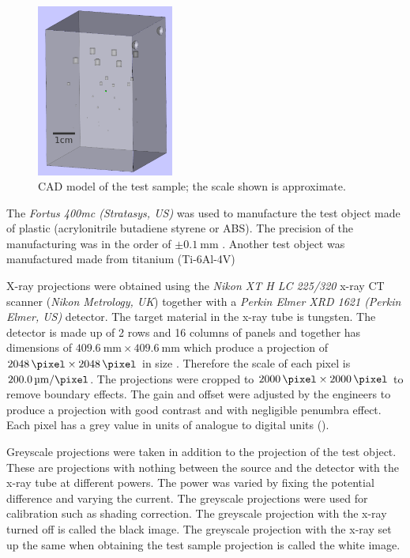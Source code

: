 \begin{figure}
  \centering
  \includegraphics[width=0.4\textwidth]{../figures/inference/TestObject.png}
  \caption{CAD model of the test sample; the scale shown is approximate.}
  \label{fig:inference_testObject}
\end{figure}

The \emph{Fortus 400mc (Stratasys, US)} was used to manufacture the test object made of plastic (acrylonitrile butadiene styrene or ABS). The precision of the manufacturing was in the order of $\pm\SI{0.1}{\milli\metre}$ \citep{hanseen2013fortus}. Another test object was manufactured made from titanium (Ti-6Al-4V)

X-ray projections were obtained using the \emph{Nikon XT H LC 225/320} x-ray CT scanner (\emph{Nikon Metrology, UK}) together with a \emph{Perkin Elmer XRD 1621 (Perkin Elmer, US)} detector. The target material in the x-ray tube is tungsten. The detector is made up of 2 rows and 16 columns of panels and together has dimensions of $\SI{409.6}{\milli\metre}\times\SI{409.6}{\milli\metre}$ which produce a projection of $\SI{2048}{\pixel}\times\SI{2048}{\pixel}$ in size \citep{perkinelmer2006xrd}. Therefore the scale of each pixel is $\SI{200.0}{\micro\metre\per\pixel}$. The projections were cropped to $\SI{2000}{\pixel}\times\SI{2000}{\pixel}$ to remove boundary effects. The gain and offset were adjusted by the engineers to produce a projection with good contrast and with negligible penumbra effect. Each pixel has a grey value in units of analogue to digital units (\SI{}{\adu}).

Greyscale projections were taken in addition to the projection of the test object. These are projections with nothing between the source and the detector with the x-ray tube at different powers. The power was varied by fixing the potential difference and varying the current. The greyscale projections were used for calibration such as shading correction. The greyscale projection with the x-ray turned off is called the black image. The greyscale projection with the x-ray set up the same when obtaining the test sample projection is called the white image.

